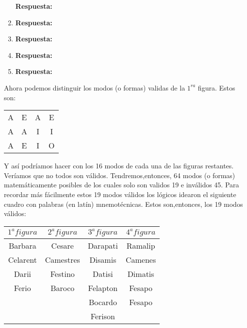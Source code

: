 \documentclass{article}
\begin{document}
\begin{enumerate}[resume]
    \textbf{Respuesta:}
    \\
    \item {} 
    \textbf{Respuesta:}
    \\
    \item {} 
    \textbf{Respuesta:}
    \\
    \item {} 
    \textbf{Respuesta:}
    \\
    \item {} 
    \textbf{Respuesta:}
    \\
    
\end{enumerate}

\newpage
Ahora podemos distinguir los modos (o formas) validas de la $1^{ra}$ figura. Estos son:

\begin{tabular}{cccc}
     A & E & A & E  \\
     A & A & I & I  \\
     \hline
     A & E & I & O  \\
\end{tabular}{}
 
Y así podríamos hacer con los 16 modos de cada una de las figuras restantes.  Veríamos que no todos son válidos. Tendremos,entonces, 64 modos (o formas) matemáticamente posibles de los cuales solo son validos 19 e inválidos 45. Para recordar más fácilmente estos 19 modos válidos los lógicos idearon el siguiente cuadro con palabras (en latín) mnemotécnicas. Estos son,entonces, los 19 modos válidos:

\begin{center}
    \begin{tabular}{|c|c|c|c|}
    \hline
     $1^a figura$ & $2^a figura$ & $3^a figura$ &  $4^a figura$ \\
     \hline
     Barbara & Cesare & Darapati & Ramalip \\
     Celarent & Camestres & Disamis & Camenes \\
     Darii & Festino & Datisi & Dimatis \\
     Ferio & Baroco & Felapton & Fesapo \\
     && Bocardo & Fesapo \\
     &&Ferison& \\
     \hline
\end{tabular}
\end{center}
\end{document}
